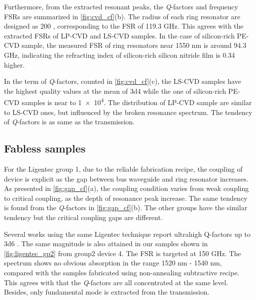 Furthermore, from the extracted resonant peaks, the \textit{Q}-factors and frequency FSRs are summarized in \autoref{fig:cvd_cf}(b). The radius of each ring resonator are designed as 200 \um, corresponding to the FSR of 119.3 GHz. This agrees with the extracted FSRs of LP-CVD and LS-CVD samples. In the case of silicon-rich PE-CVD sample, the measured FSR of ring resonators near 1550 nm is around 94.3 GHz, indicating the refracting index of silicon-rich silicon nitride film is 0.34 higher.

In the term of \textit{Q}-factors, counted in \autoref{fig:cvd_cf}(c), the LS-CVD samples have the highest quality values at the mean of \num{3d4} while the one of silicon-rich PE-CVD samples is near to \num{1e4}. The distribution of LP-CVD sample are similar to LS-CVD ones, but influenced by the broken resonance spectrum. The tendency of \textit{Q}-factors is as same as the transmission.

\begin{figure}
	\centering
	
	\label{fig:cvd_cf}
\end{figure}



\subsection{Fabless samples}

For the Ligentec group 1, due to the reliable fabrication recipe, the coupling of device is explicit as the gap between bus waveguide and ring resonator increases. As presented in \autoref{fig:gap_cf}(a), the coupling condition varies from weak coupling to critical coupling, as the depth of resonance peak increase. The same tendency is found from the \textit{Q}-factors in \autoref{fig:gap_cf}(b). The other groups have the similar tendency but the critical coupling gaps are different.%

\begin{figure}
	\centering
	
	\label{fig:gap_cf}
\end{figure}

Several works using the same Ligentec technique report ultrahigh Q-factors up to \num{3d6} \cites{Yu2019, Vaidya2019}. The same magnitude is also attained in our samples shown in \autoref{fig:ligentec_gp2} from group2 device 4. The FSR is targeted at 150 GHz. The spectrum shows no obvious absorption in the range 1520 nm - 1540 nm, compared with the samples fabricated using non-annealing subtractive recipe. This agrees with that the \textit{Q}-factors are all concentrated at the same level. 
Besides, only fundamental mode is extracted from the transmission. 

